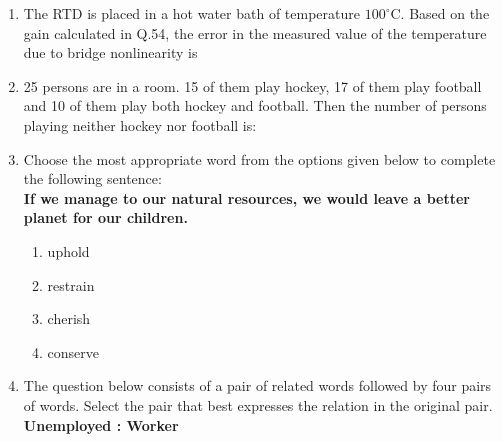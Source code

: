 \documentclass[journal,12pt,onecolumn]{IEEEtran}
\theoremstyle{remark}
\begin{document}
\begin{enumerate}
\item The RTD is placed in a hot water bath of temperature $100^\circ$C. Based on the gain calculated in Q.54, the error in the measured value of the temperature due to bridge nonlinearity is
\hfill{}\begin{enumerate}  \end{enumerate}

\newpage

\item 25 persons are in a room. 15 of them play hockey, 17 of them play football and 10 of them play both hockey and football. Then the number of persons playing neither hockey nor football is:
\hfill{}\begin{enumerate}  \end{enumerate}

\vspace{0.5cm}

\item Choose the most appropriate word from the options given below to complete the following sentence: \\
\textbf{If we manage to \underline{\hspace{2cm}} our natural resources, we would leave a better planet for our children.}

\hfill{}
\begin{enumerate}
    \item uphold
    \item restrain
    \item cherish
    \item conserve
\end{enumerate}

\vspace{0.5cm}

\item The question below consists of a pair of related words followed by four pairs of words. Select the pair that best expresses the relation in the original pair. \\
\textbf{Unemployed : Worker}


\end{enumerate}
\end{document}
